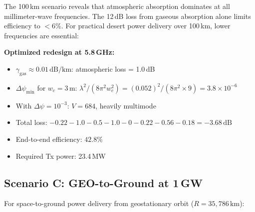 \documentclass[journal,twocolumn]{IEEEtran}
\begin{document}
The 100\,km scenario reveals that atmospheric absorption dominates
at all millimeter-wave frequencies. The 12\,dB loss from gaseous
absorption alone limits efficiency to $<$6\%. For practical desert
power delivery over 100\,km, lower frequencies are essential:

\textbf{Optimized redesign at 5.8\,GHz:}
\begin{itemize}
\item $\gamma_\text{gas} \approx 0.01\,\text{dB/km}$: atmospheric loss = 1.0\,dB
\item $\Delta\psi_\text{min}$ for $w_c = 3\,\text{m}$:
$\lambda^2/(8\pi^2 w_c^2) = (0.052)^2/(8\pi^2\times9) = 3.8\times10^{-6}$
\item With $\Delta\psi = 10^{-3}$: $V = 684$, heavily multimode
\item Total loss: $-0.22 - 1.0 - 0.5 - 1.0 - 0 - 0.22 - 0.56 - 0.18 = -3.68\,\text{dB}$
\item End-to-end efficiency: $\mathbf{42.8\%}$
\item Required Tx power: 23.4\,MW
\end{itemize}

\subsection{Scenario C: GEO-to-Ground at 1\,GW}

For space-to-ground power delivery from geostationary orbit
($R = 35{,}786\,\text{km}$):
\end{document}
